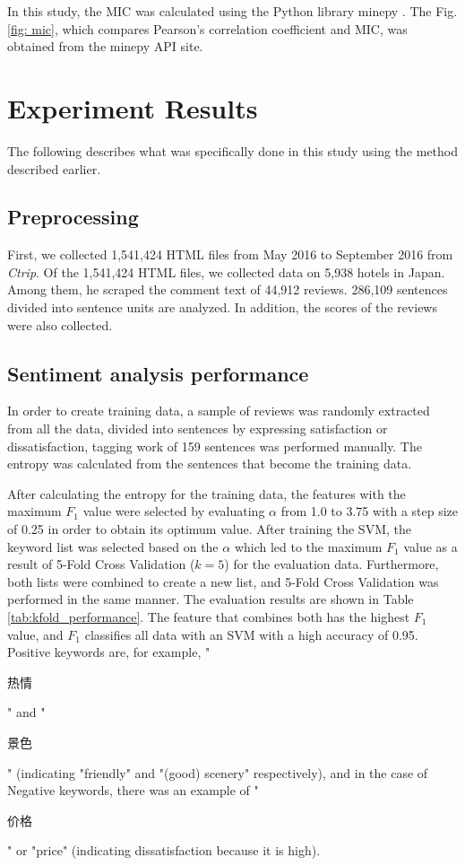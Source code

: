 \documentclass[review]{elsarticle}
\begin{document}
In this study, the MIC was calculated using the Python library minepy \cite[][]{Albanese2012}. The Fig. \ref{fig: mic}, which compares Pearson's correlation coefficient and MIC, was obtained from the minepy API site.

\section{Experiment Results}\label{results}

The following describes what was specifically done in this study using the method described earlier.

\subsection{Preprocessing}\label{res_preprocessing}

First, we collected 1,541,424 HTML files from May 2016 to September 2016 from \textit{Ctrip}. Of the 1,541,424 HTML files, we collected data on 5,938 hotels in Japan. Among them, he scraped the comment text of 44,912 reviews. 286,109 sentences divided into sentence units are analyzed. In addition, the scores of the reviews were also collected.

\subsection{Sentiment analysis performance}\label{res_sentiment_analysis}

In order to create training data, a sample of reviews was randomly extracted from all the data, divided into sentences by expressing satisfaction or dissatisfaction, tagging work of 159 sentences was performed manually. The entropy was calculated from the sentences that become the training data.

After calculating the entropy for the training data, the features with the maximum \(F_1\) value were selected by evaluating \(\alpha\) from 1.0 to 3.75 with a step size of 0.25 in order to obtain its optimum value. After training the SVM, the keyword list was selected based on the \(\alpha\) which led to the maximum \(F_1\) value as a result of 5-Fold Cross Validation (\(k = 5\)) for the evaluation data. Furthermore, both lists were combined to create a new list, and 5-Fold Cross Validation was performed in the same manner. The evaluation results are shown in Table \ref{tab:kfold_performance}. The feature that combines both has the highest \(F_1\) value, and \(F_1\) classifies all data with an SVM with a high accuracy of 0.95. Positive keywords are, for example, "\begin{CJK}{UTF8}{min}热情\end{CJK}" and "\begin{CJK}{UTF8}{min}景色\end{CJK}" (indicating "friendly" and "(good) scenery" respectively), and in the case of Negative keywords, there was an example of "\begin{CJK}{UTF8}{min}价格\end{CJK}" or "price" (indicating dissatisfaction because it is high).
\end{document}
